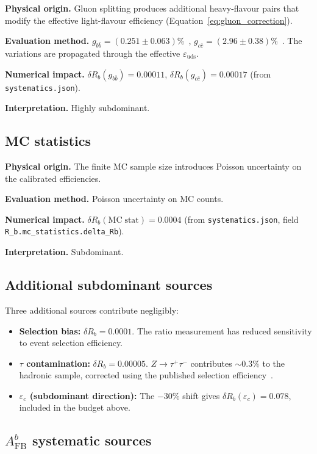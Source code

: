\documentclass[11pt,a4paper]{article}
\begin{document}
\textbf{Physical origin.} Gluon splitting produces additional heavy-flavour pairs
that modify the effective light-flavour efficiency (Equation~\ref{eq:gluon_correction}).

\textbf{Evaluation method.}
$g_{b\bar{b}} = (0.251 \pm 0.063)\%$~\cite{LEP:HF:2001},
$g_{c\bar{c}} = (2.96 \pm 0.38)\%$~\cite{LEP:gcc}.
The variations are propagated through the effective $\varepsilon_\mathrm{uds}$.

\textbf{Numerical impact.}
$\delta R_b(g_{b\bar{b}}) = 0.00011$,
$\delta R_b(g_{c\bar{c}}) = 0.00017$
(from \texttt{systematics.json}).

\textbf{Interpretation.} Highly subdominant.

\subsection{MC statistics}
\label{sec:syst_mc_stat}

\textbf{Physical origin.} The finite MC sample size introduces Poisson uncertainty on
the calibrated efficiencies.

\textbf{Evaluation method.} Poisson uncertainty on MC counts.

\textbf{Numerical impact.}
$\delta R_b(\mathrm{MC\;stat}) = 0.0004$
(from \texttt{systematics.json}, field \texttt{R\_b.mc\_statistics.delta\_Rb}).

\textbf{Interpretation.} Subdominant.

\subsection{Additional subdominant sources}
\label{sec:syst_minor}

Three additional sources contribute negligibly:
\begin{itemize}
\item \textbf{Selection bias:}
$\delta R_b = 0.0001$. The ratio measurement has reduced sensitivity
to event selection efficiency.
\item \textbf{$\tau$ contamination:}
$\delta R_b = 0.00005$. $Z \to \tau^+\tau^-$ contributes $\sim 0.3\%$ to the
hadronic sample, corrected using the published selection efficiency~\cite{ALEPH:sigma_had}.
\item \textbf{$\varepsilon_c$ (subdominant direction):} The $-30\%$ shift gives
$\delta R_b(\varepsilon_c) = 0.078$, included in the budget above.
\end{itemize}

\subsection{$A_\mathrm{FB}^b$ systematic sources}
\label{sec:syst_afb}
\end{document}
